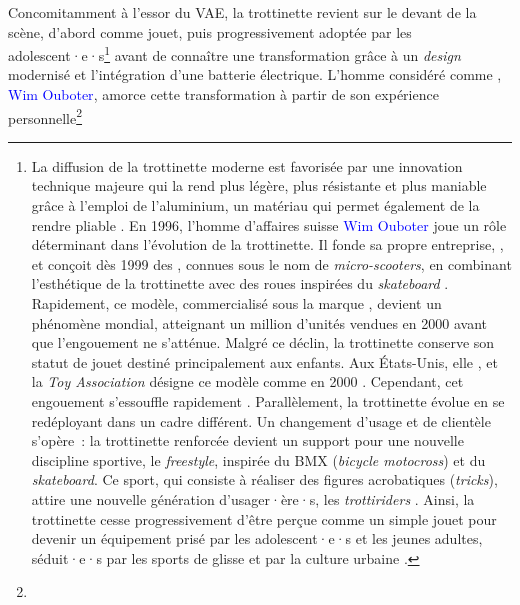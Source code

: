\begin{refsegment}
Concomitamment à l’essor du \acrshort{VAE}, la trottinette revient sur le devant de la scène, d’abord comme jouet, puis progressivement adoptée par les adolescent·e·s\footnote{
    La diffusion de la trottinette moderne est favorisée par une innovation technique majeure qui la rend plus légère, plus résistante et plus maniable grâce à l’emploi de l’aluminium, un matériau qui permet également de la rendre pliable \textcolor{blue}{\autocite{arte_histoire_2014}}. En 1996, l’homme d’affaires suisse \textcolor{blue}{Wim Ouboter} joue un rôle déterminant dans l’évolution de la trottinette. Il fonde sa propre entreprise, , et conçoit dès 1999 des , connues sous le nom de \textsl{micro-scooters}, en combinant l’esthétique de la trottinette avec des roues inspirées du \textit{skateboard} \textcolor{blue}{\autocite{les_numeriques_futur_2015}}. Rapidement, ce modèle, commercialisé sous la marque , devient un phénomène mondial, atteignant un million d’unités vendues en 2000 avant que l’engouement ne s’atténue. Malgré ce déclin, la trottinette conserve son statut de jouet destiné principalement aux enfants. Aux États-Unis, elle , et la \textsl{Toy Association} désigne ce modèle comme  en 2000 \textcolor{blue}{\autocite{bloomberg_citylab_man_2018}}. Cependant, cet engouement s’essouffle rapidement \textcolor{blue}{\autocite[25]{university_of_st_gallen_micro_2011}}. Parallèlement, la trottinette évolue en se redéployant dans un cadre différent. Un changement d’usage et de clientèle s’opère~: la trottinette renforcée devient un support pour une nouvelle discipline sportive, le \textsl{freestyle}, inspirée du BMX (\textsl{bicycle motocross}) et du \textit{skateboard}. Ce sport, qui consiste à réaliser des figures acrobatiques (\textsl{tricks}), attire une nouvelle génération d’usager·ère·s, les \textsl{trottiriders} \textcolor{blue}{\autocite{micro-mobility_innovations_2018}}. Ainsi, la trottinette cesse progressivement d’être perçue comme un simple jouet pour devenir un équipement prisé par les adolescent·e·s et les jeunes adultes, séduit·e·s par les sports de glisse et par la culture urbaine \textcolor{blue}{\autocite{ma_trott_histoire_2020}}.
} avant de connaître une transformation grâce à un \textsl{design} modernisé et l’intégration d’une batterie électrique. L’homme considéré comme , \textcolor{blue}{Wim Ouboter}, amorce cette transformation à partir de son expérience personnelle\footnote{
}
\end{refsegment}
